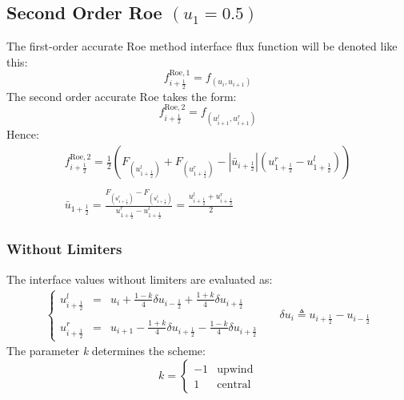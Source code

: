 \documentclass[11pt, a4paper]{article}
\begin{document}
\subsection{Second Order Roe $(u_1 = 0.5)$}
The first-order accurate Roe method interface flux function will be denoted like this:
\begin{equation*}
    f_{i+\frac{1}{2}}^{\mathrm{Roe},1}=f_{\left(u_i, u_{i+1}\right)}
\end{equation*}
The second order accurate Roe takes the form:
\begin{equation*}
    f_{i+\frac{1}{2}}^{\mathrm{Roe},2}=f_{\left(u_{i+1}^l, u_{i+1}^r\right)}
\end{equation*}
Hence:
\begin{equation}
    \begin{matrix}
        \displaystyle f_{i+\frac{1}{2}}^{\mathrm{Roe},2}=\frac{1}{2}\left(F_{\left(u_{1+\frac{1}{2}}^l\right)}+F_{\left(u_{1+\frac{1}{2}}^r\right)}-\left|\bar{u}_{i+\frac{1}{2}}\right|\left(u_{1+\frac{1}{2}}^r-u_{1+\frac{1}{2}}^l\right)\right) \\\\
        \displaystyle \bar{u}_{1+\frac{1}{2}}=\frac{F_{\left(u_{1+\frac{1}{2}}^r\right)}-F_{\left(u_{1+\frac{1}{2}}^l\right)}}{u_{1+\frac{1}{2}}^r-u_{1+\frac{1}{2}}^l} = \frac{u_{i+\frac{1}{2}}^l+u_{i+\frac{1}{2}}^r}{2}
    \end{matrix}
\end{equation}

\subsubsection{Without Limiters}
The interface values without limiters are evaluated as:
\begin{equation}
    \begin{matrix}
        \left\{\begin{array}{lcl}
            u_{i+\frac{1}{2}}^l & = & \displaystyle u_i+\frac{1-k}{4}\delta u_{i-\frac{1}{2}}+\frac{1+k}{4}\delta u_{i+\frac{1}{2}} \\\\
            u_{i+\frac{1}{2}}^r & = & \displaystyle u_{i+1}-\frac{1+k}{4}\delta u_{i+\frac{1}{2}}-\frac{1-k}{4}\delta u_{i+\frac{3}{2}}
        \end{array}\right. && \delta u_i\triangleq u_{i+\frac{1}{2}} - u_{i-\frac{1}{2}}
    \end{matrix}
\end{equation}
The parameter \emph{k} determines the scheme:
\begin{equation*}
    k = \left\{\begin{array}{cr}
        -1 & \mathrm{upwind} \\
        1 & \mathrm{central}
    \end{array}\right.
\end{equation*}
\end{document}
